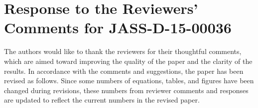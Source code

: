 \documentclass[11pt]{article}
\begin{document}

\section*{Response to the Reviewers' Comments for JASS-D-15-00036}

The authors would like to thank the reviewers for their thoughtful comments, which are aimed toward improving the quality of the paper and the clarity of the results. In accordance with the comments and suggestions, the paper has been revised as follows.
Since some numbers of equations, tables, and figures have been changed during revisions, these numbers from reviewer comments and responses are updated to reflect the current numbers in the revised paper.

\end{document}
